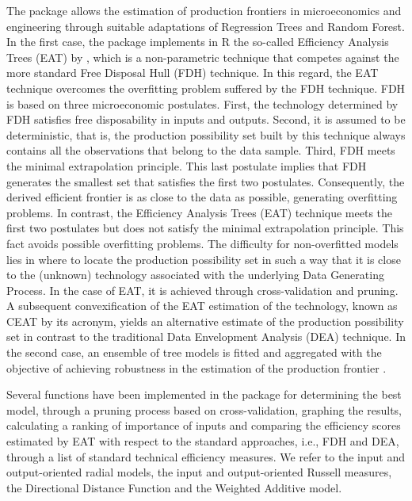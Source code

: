 The  package allows the estimation of production frontiers in
microeconomics and engineering through suitable adaptations of
Regression Trees and Random Forest. In the first case, the package
implements in R the so-called Efficiency Analysis Trees (EAT) by
\citet{esteve2020}, which is a non-parametric technique that competes
against the more standard Free Disposal Hull (FDH) technique. In this
regard, the EAT technique overcomes the overfitting problem suffered by
the FDH technique. FDH is based on three microeconomic postulates.
First, the technology determined by FDH satisfies free disposability in
inputs and outputs. Second, it is assumed to be deterministic, that is,
the production possibility set built by this technique always contains
all the observations that belong to the data sample. Third, FDH meets
the minimal extrapolation principle. This last postulate implies that
FDH generates the smallest set that satisfies the first two postulates.
Consequently, the derived efficient frontier is as close to the data as
possible, generating overfitting problems. In contrast, the Efficiency
Analysis Trees (EAT) technique meets the first two postulates but does
not satisfy the minimal extrapolation principle. This fact avoids
possible overfitting problems. The difficulty for non-overfitted models
lies in where to locate the production possibility set in such a way
that it is close to the (unknown) technology associated with the
underlying Data Generating Process. In the case of EAT, it is achieved
through cross-validation and pruning. A subsequent convexification of
the EAT estimation of the technology, known as CEAT by its acronym,
yields an alternative estimate of the production possibility set in
contrast to the traditional Data Envelopment Analysis (DEA) technique.
In the second case, an ensemble of tree models is fitted and aggregated
with the objective of achieving robustness in the estimation of the
production frontier \citep{esteve2021}.

Several functions have been implemented in the  package for
determining the best model, through a pruning process based on
cross-validation, graphing the results, calculating a ranking of
importance of inputs and comparing the efficiency scores estimated by
EAT with respect to the standard approaches, i.e., FDH and DEA, through
a list of standard technical efficiency measures. We refer to the input
and output-oriented radial models, the input and output-oriented Russell
measures, the Directional Distance Function and the Weighted Additive
model.

